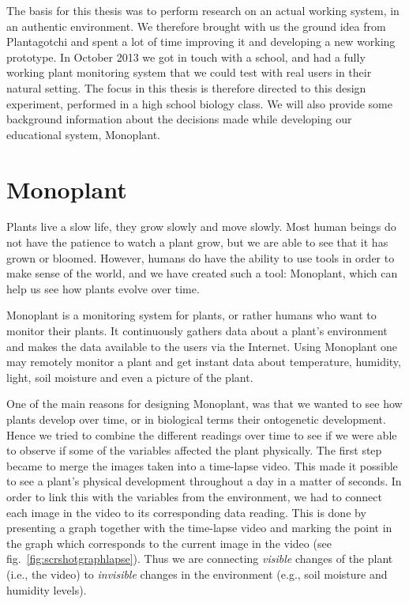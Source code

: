 The basis for this thesis was to perform research on an actual working system, in an authentic environment. We therefore brought with us the ground idea from Plantagotchi and spent a lot of time improving it and developing a new working prototype. In October 2013 we got in touch with a school, and had a fully working plant monitoring system that we could test with real users in their natural setting. The focus in this thesis is therefore directed to this design experiment, performed in a high school biology class. We will also provide some background information about the decisions made while developing our educational system, Monoplant. 


\section{Monoplant}
Plants live a slow life, they grow slowly and move slowly. Most human beings do not have the patience to watch a plant grow, but we are able to see that it has grown or bloomed. However, humans do have the ability to use tools in order to make sense of the world, and we have created such a tool: Monoplant, which can help us see how plants evolve over time.

Monoplant is a monitoring system for plants, or rather humans who want to monitor their plants. It continuously gathers data about a plant's environment and makes the data available to the users via the Internet. Using Monoplant one may remotely monitor a plant and get instant data about temperature, humidity, light, soil moisture and even a picture of the plant. 

One of the main reasons for designing Monoplant, was that we wanted to see how plants develop over time, or in biological terms their ontogenetic development. Hence we tried to combine the different readings over time to see if we were able to observe if some of the variables affected the plant physically. The first step became to merge the images taken into a time-lapse video. This made it possible to see a plant's physical development throughout a day in a matter of seconds. In order to link this with the variables from the environment, we had to connect each image in the video to its corresponding data reading. This is done by presenting a graph together with the time-lapse video and marking the point in the graph which corresponds to the current image in the video (see fig.~\ref{fig:scrshotgraphlapse}). Thus we are connecting \emph{visible} changes of the plant (i.e., the video) to \emph{invisible} changes in the environment (e.g., soil moisture and humidity levels).



